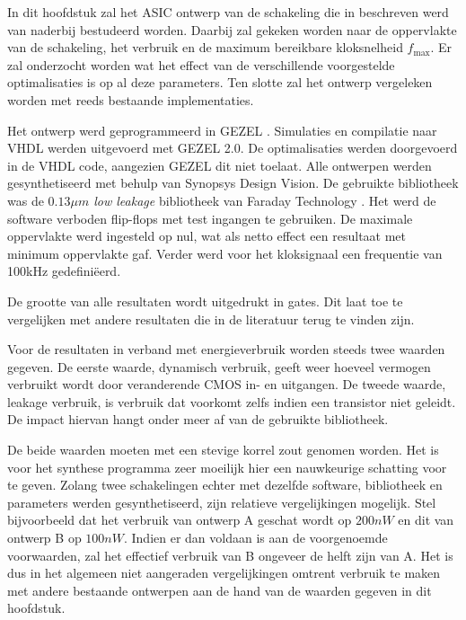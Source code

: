 
In dit hoofdstuk zal het ASIC ontwerp van de schakeling die in  beschreven werd van naderbij bestudeerd worden. Daarbij zal gekeken worden naar de oppervlakte van de schakeling, het verbruik en de maximum bereikbare kloksnelheid $f_{\text{max}}$. Er zal onderzocht worden wat het effect van de verschillende voorgestelde optimalisaties is op al deze parameters. Ten slotte zal het ontwerp vergeleken worden met reeds bestaande implementaties.

Het ontwerp werd geprogrammeerd in GEZEL \cite{gezel}. Simulaties en compilatie naar VHDL werden uitgevoerd met GEZEL 2.0. De optimalisaties werden doorgevoerd in de VHDL code, aangezien GEZEL dit niet toelaat. Alle ontwerpen werden gesynthetiseerd met behulp van Synopsys Design Vision. De gebruikte bibliotheek was de \emph{$0.13 \mu m$ low leakage} bibliotheek van Faraday Technology \cite{cell-databook}. Het werd de software verboden flip-flops met test ingangen te gebruiken. De maximale oppervlakte werd ingesteld op nul, wat als netto effect een resultaat met minimum oppervlakte gaf. Verder werd voor het kloksignaal een frequentie van 100kHz gedefini\"eerd.

De grootte van alle resultaten wordt uitgedrukt in gates. Dit laat toe te vergelijken met andere resultaten die in de literatuur terug te vinden zijn.

Voor de resultaten in verband met energieverbruik worden steeds twee waarden gegeven. De eerste waarde, dynamisch verbruik, geeft weer hoeveel vermogen verbruikt wordt door veranderende CMOS in- en uitgangen. De tweede waarde, leakage verbruik, is verbruik dat voorkomt zelfs indien een transistor niet geleidt. De impact hiervan hangt onder meer af van de gebruikte bibliotheek.

De beide waarden moeten met een stevige korrel zout genomen worden. Het is voor het synthese programma zeer moeilijk hier een nauwkeurige schatting voor te geven. Zolang twee schakelingen echter met dezelfde software, bibliotheek en parameters werden gesynthetiseerd, zijn relatieve vergelijkingen mogelijk. Stel bijvoorbeeld dat het verbruik van ontwerp A geschat wordt op $200 nW$ en dit van ontwerp B op $100 nW$. Indien er dan voldaan is aan de voorgenoemde voorwaarden, zal het effectief verbruik van B ongeveer de helft zijn van A. Het is dus in het algemeen niet aangeraden vergelijkingen omtrent verbruik te maken met andere bestaande ontwerpen aan de hand van de waarden gegeven in dit hoofdstuk.

